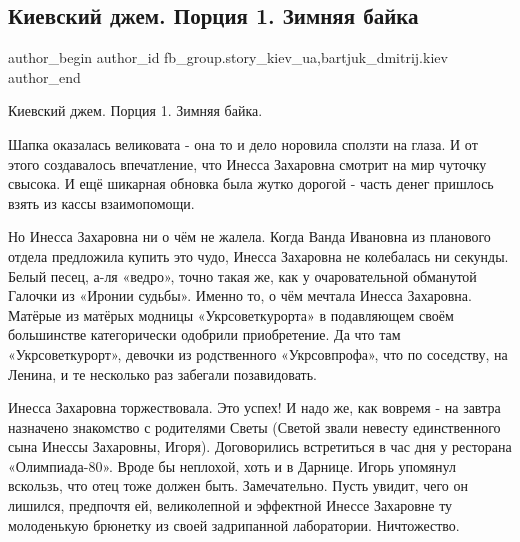  
 
 
 
 
 
\subsection{Киевский джем.  Порция 1. Зимняя байка}
\label{sec:29_12_2021.fb.fb_group.story_kiev_ua.3.zimnjaja_bajka}
 
\ifcmt
 author_begin
   author_id fb_group.story_kiev_ua,bartjuk_dmitrij.kiev
 author_end
\fi

Киевский джем.  Порция 1. Зимняя байка.

Шапка оказалась великовата - она то и дело норовила сползти на глаза. И от
этого создавалось впечатление, что Инесса Захаровна смотрит на мир чуточку
свысока. И ещё шикарная обновка была жутко дорогой - часть денег пришлось взять
из кассы взаимопомощи. 

Но Инесса Захаровна ни о чём не жалела. Когда Ванда Ивановна из планового
отдела предложила купить это чудо, Инесса Захаровна не колебалась ни секунды.
Белый песец, а-ля «ведро», точно такая же, как у очаровательной обманутой
Галочки из «Иронии судьбы». Именно то, о чём мечтала Инесса Захаровна. Матёрые
из матёрых модницы «Укрсоветкурорта» в подавляющем своём большинстве
категорически одобрили приобретение. Да что там «Укрсоветкурорт», девочки из
родственного «Укрсовпрофа», что по соседству, на Ленина, и те несколько раз
забегали позавидовать. 


Инесса Захаровна торжествовала. Это успех! И надо же, как вовремя - на завтра
назначено знакомство с родителями Светы (Светой звали невесту единственного
сына Инессы Захаровны, Игоря). Договорились встретиться в час дня у ресторана
«Олимпиада-80». Вроде бы неплохой, хоть и в Дарнице. Игорь упомянул вскользь,
что отец тоже должен быть. Замечательно. Пусть увидит, чего он лишился,
предпочтя ей, великолепной и эффектной Инессе Захаровне ту молоденькую брюнетку
из своей задрипанной лаборатории. Ничтожество.

